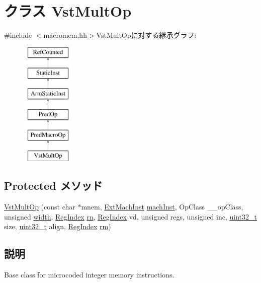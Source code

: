 \hypertarget{classArmISA_1_1VstMultOp}{
\section{クラス VstMultOp}
\label{classArmISA_1_1VstMultOp}
}


{\ttfamily \#include $<$macromem.hh$>$}VstMultOpに対する継承グラフ:\begin{figure}[H]
\begin{center}
\leavevmode
\includegraphics[height=6cm]{classArmISA_1_1VstMultOp}
\end{center}
\end{figure}
\subsection*{Protected メソッド}
\begin{DoxyCompactItemize}
\item 
\hyperlink{classArmISA_1_1VstMultOp_a701693769a1feaeea70657430ea392b3}{VstMultOp} (const char $\ast$mnem, \hyperlink{classStaticInst_a5605d4fc727eae9e595325c90c0ec108}{ExtMachInst} \hyperlink{classStaticInst_a744598b194ca3d4201d9414ce4cc4af4}{machInst}, OpClass \_\-\_\-opClass, unsigned \hyperlink{namespaceArmISA_a0da89c280130b84ae26405a901396428}{width}, \hyperlink{classStaticInst_a36d25e03e43fa3bb4c5482cbefe5e0fb}{RegIndex} \hyperlink{namespaceArmISA_adf8c6c579ad8729095a637a4f2181211}{rn}, \hyperlink{classStaticInst_a36d25e03e43fa3bb4c5482cbefe5e0fb}{RegIndex} vd, unsigned regs, unsigned inc, \hyperlink{Type_8hh_a435d1572bf3f880d55459d9805097f62}{uint32\_\-t} size, \hyperlink{Type_8hh_a435d1572bf3f880d55459d9805097f62}{uint32\_\-t} align, \hyperlink{classStaticInst_a36d25e03e43fa3bb4c5482cbefe5e0fb}{RegIndex} \hyperlink{namespaceArmISA_ad546c2cf2168cf2d8ac21b2a9f485e82}{rm})
\end{DoxyCompactItemize}


\subsection{説明}
Base class for microcoded integer memory instructions. 

